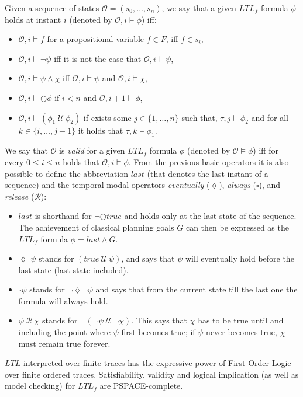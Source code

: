 \documentclass[3p,times]{elsarticle}
\begin{document}
Given a sequence of states $\mathcal{O}=(s_0,\ldots, s_n)$, we say that a given $LTL_f$ formula $\phi$ holds at instant $i$ (denoted by $\mathcal{O}, i\models\phi$) iff:
\begin{itemize}
\item $\mathcal{O}, i\models f$ for a propositional variable $f\in F$, iff $f\in s_i$,
\item $\mathcal{O}, i\models \neg\psi$ iff it is not the case that $\mathcal{O}, i\models\psi$,
\item $\mathcal{O}, i\models \psi\wedge\chi$ iff $\mathcal{O}, i\models\psi$ and $\mathcal{O}, i\models\chi$,
\item $\mathcal{O}, i\models \bigcirc\phi$ if $i<n$ and $\mathcal{O}, i+1\models\phi$,
\item $\mathcal{O}, i\models (\phi_1\ {\mathcal U}\ \phi_2)$ if exists some $j\in\{1,\ldots,n\}$ such that, $\tau, j\models \phi_2$ and for all $k\in\{i,\ldots,j-1\}$ it holds that $\tau, k\models \phi_1$.
\end{itemize}
We say that $\mathcal{O}$ is {\em valid} for a given $LTL_f$ formula $\phi$ (denoted by $\mathcal{O}\models\phi$) iff for every {\small $0\leq i\leq n$} holds that $\mathcal{O}, i\models\phi$. From the previous basic operators it is also possible to define the abbreviation $last$ (that denotes the last instant of a sequence) and the temporal modal operators {\em eventually} ($\lozenge$), {\em always} ($\square$), and {\em release} (${\mathcal R}$):
\begin{itemize}
\item $last$ is shorthand for $\neg\bigcirc true$ and holds only at the last state of the sequence. The achievement of classical planning goals $G$ can then be expressed as the $LTL_f$ formula $\phi=last\wedge G$.  
\item $\lozenge$ $\psi$ stands for $(true\ {\mathcal U}\ \psi)$, and says that $\psi$ will eventually hold before the last state (last state included).
\item $\square\psi$ stands for $\neg \lozenge \neg\psi$ and says that from the current state till the last one the formula will always hold.
\item $\psi\ {\mathcal R}\ \chi$ stands for $\neg(\neg\psi\ {\mathcal U}\ \neg\chi)$. This says that $\chi$ has to be true until and including the point where $\psi$ first becomes true; if $\psi$ never becomes true, $\chi$ must remain true forever.
\end{itemize}

$LTL$ interpreted over finite traces has the expressive power of First Order Logic over finite ordered traces. Satisfiability, validity and logical implication (as well as model checking) for $LTL_f$ are PSPACE-complete.
\end{document}
